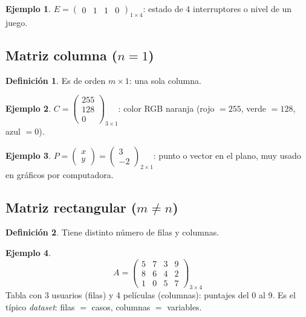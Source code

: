 \documentclass[a4paper,12pt]{article}
\theoremstyle{definition}
\newtheorem{definicion}{Definición}[section]
\newtheorem{ejemplo}{Ejemplo}[section]
\begin{document}
\begin{ejemplo}
$E = \begin{pmatrix} 0 & 1 & 1 & 0 \end{pmatrix}_{1 \times 4}$: estado de 4 interruptores o nivel de un juego.
\end{ejemplo}

\subsection{Matriz columna ($n=1$)}
\begin{definicion}
Es de orden $m \times 1$: una sola columna.
\end{definicion}

\begin{ejemplo}
$C = \begin{pmatrix} 255 \\ 128 \\ 0 \end{pmatrix}_{3 \times 1}$: color RGB naranja (rojo $=255$, verde $=128$, azul $=0$).
\end{ejemplo}

\begin{ejemplo}
$P = \begin{pmatrix} x \\ y \end{pmatrix} = \begin{pmatrix} 3 \\ -2 \end{pmatrix}_{2 \times 1}$: punto o vector en el plano, muy usado en gráficos por computadora.
\end{ejemplo}

\subsection{Matriz rectangular ($m \neq n$)}
\begin{definicion}
Tiene distinto número de filas y columnas.
\end{definicion}

\begin{ejemplo}
\[
A = \begin{pmatrix}
5 & 7 & 3 & 9 \\
8 & 6 & 4 & 2 \\
1 & 0 & 5 & 7
\end{pmatrix}_{3 \times 4}
\]
Tabla con 3 usuarios (filas) y 4 películas (columnas): puntajes del 0 al 9. Es el típico \textit{dataset}: filas $=$ casos, columnas $=$ variables.
\end{ejemplo}
\end{document}
